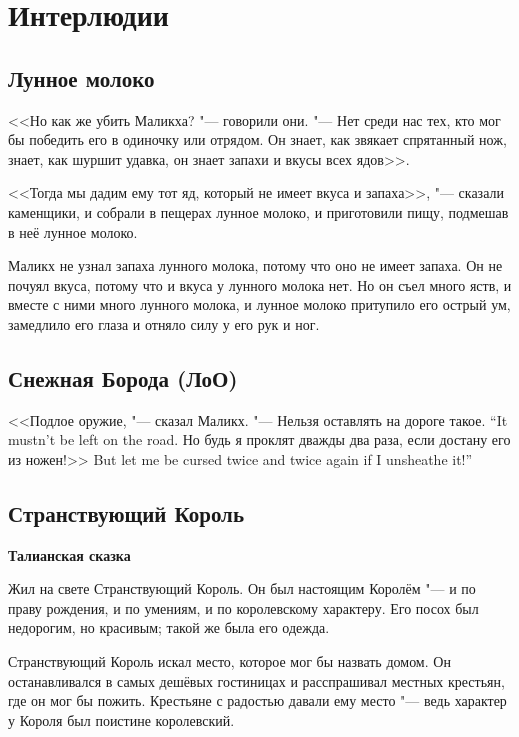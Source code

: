 \chapter{Интерлюдии}

\section{Лунное молоко}

<<Но как же убить Маликха? "--- говорили они.
"--- Нет среди нас тех, кто мог бы победить его в одиночку или отрядом.
Он знает, как звякает спрятанный нож, знает, как шуршит удавка, он знает запахи и вкусы всех ядов>>.

<<Тогда мы дадим ему тот яд, который не имеет вкуса и запаха>>, "--- сказали каменщики, и собрали в пещерах лунное молоко, и приготовили пищу, подмешав в неё лунное молоко.

Маликх не узнал запаха лунного молока, потому что оно не имеет запаха.
Он не почуял вкуса, потому что и вкуса у лунного молока нет.
Но он съел много яств, и вместе с ними много лунного молока, и лунное молоко притупило его острый ум, замедлило его глаза и отняло силу у его рук и ног.

\section{Снежная Борода (ЛоО)}

<<Подлое оружие, "--- сказал Маликх.
{"--- Нельзя оставлять на дороге такое.}
{``It mustn't be left on the road.}
{Но будь я проклят дважды два раза, если достану его из ножен!>>}
{But let me be cursed twice and twice again if I unsheathe it!''}

\section{Странствующий Король}

\textbf{Талианская сказка}

Жил на свете Странствующий Король.
Он был настоящим Королём "--- и по праву рождения, и по умениям, и по королевскому характеру.
Его посох был недорогим, но красивым;
такой же была его одежда.

Странствующий Король искал место, которое мог бы назвать домом.
Он останавливался в самых дешёвых гостиницах и расспрашивал местных крестьян, где он мог бы пожить.
Крестьяне с радостью давали ему место "--- ведь характер у Короля был поистине королевский.

